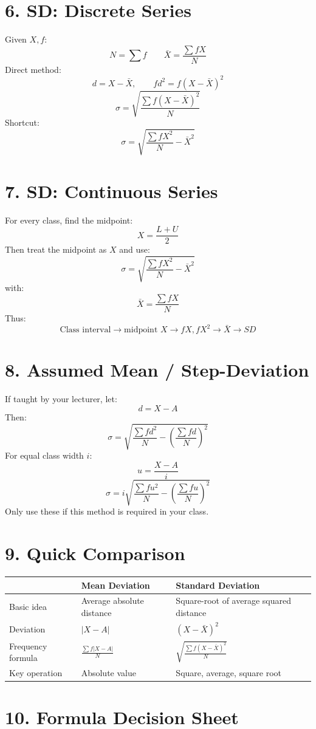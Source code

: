 \documentclass[10pt,a4paper]{article}
\newcommand{\F}[1]{\[\boxed{\displaystyle #1}\]}
\begin{document}
\section*{6. SD: Discrete Series}
Given $X,f$:
\F{N=\sum f\qquad\bar X=\frac{\sum fX}{N}}
Direct method:
\[
d=X-\bar X,\qquad fd^2=f(X-\bar X)^2
\]
\F{\sigma=\sqrt{\frac{\sum f(X-\bar X)^2}{N}}}
Shortcut:
\F{\sigma=\sqrt{\frac{\sum fX^2}{N}-\bar X^2}}

\section*{7. SD: Continuous Series}
For every class, find the midpoint:
\F{X=\frac{L+U}{2}}
Then treat the midpoint as $X$ and use:
\F{\sigma=\sqrt{\frac{\sum fX^2}{N}-\bar X^2}}
with:
\[
\bar X=\frac{\sum fX}{N}
\]
Thus:
\[
\boxed{\text{Class interval}\rightarrow\text{midpoint }X
\rightarrow fX,fX^2\rightarrow\bar X\rightarrow SD}
\]

\section*{8. Assumed Mean / Step-Deviation}
If taught by your lecturer, let:
\[
d=X-A
\]
Then:
\F{\sigma=\sqrt{\frac{\sum fd^2}{N}-
\left(\frac{\sum fd}{N}\right)^2}}
For equal class width $i$:
\[
u=\frac{X-A}{i}
\]
\F{\sigma=i\sqrt{\frac{\sum fu^2}{N}-
\left(\frac{\sum fu}{N}\right)^2}}
Only use these if this method is required in your class.

\section*{9. Quick Comparison}

\begin{center}
\begin{tabular}{p{4cm}p{4.3cm}p{4.3cm}}
\toprule
&\textbf{Mean Deviation}&\textbf{Standard Deviation}\\ \midrule
Basic idea&Average absolute distance&Square-root of average squared distance\\
Deviation&$|X-A|$&$(X-\bar X)^2$\\
Frequency formula&$\frac{\sum f|X-A|}{N}$&
$\sqrt{\frac{\sum f(X-\bar X)^2}{N}}$\\
Key operation&Absolute value&Square, average, square root\\
\bottomrule
\end{tabular}
\end{center}

\section*{10. Formula Decision Sheet}
\end{document}
